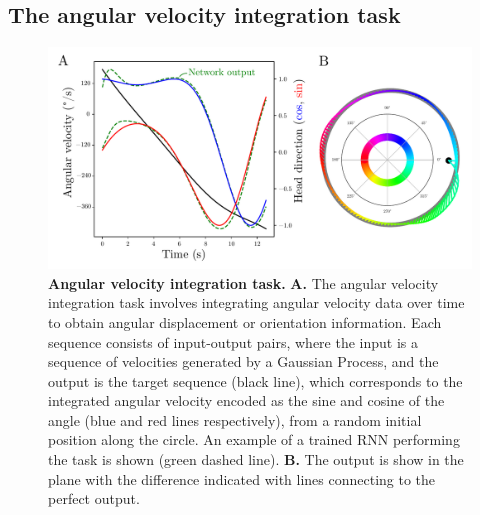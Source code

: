 \documentclass{article}
\newcounter{ct}
\theoremstyle{definition}
\theoremstyle{remark}
\begin{document}
\subsection{The angular velocity integration task}
\begin{figure}[H]
    \centering
    \includegraphics[width=\textwidth]{figures/angular_task.pdf}
    \caption{\textbf{Angular velocity integration task.}
    \textbf{A.} The angular velocity integration task involves integrating angular velocity data over time to obtain angular displacement or orientation information.
    Each sequence consists of input-output pairs, where the input is a sequence of velocities generated by a Gaussian Process, and the output is the target sequence (black line), which corresponds to the integrated angular velocity encoded as the sine and cosine of the angle (blue and red lines respectively), from a random initial position along the circle.
    An example of a trained RNN performing the task is shown (green dashed line).
    \textbf{B.} The output is show in the plane with the difference indicated with lines connecting to the perfect output.
    }
    \label{fig:angular_task}
\end{figure}
\end{document}
